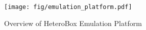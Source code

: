 \begin{figure}[t]
  \centering
  \texttt{[image: fig/emulation\_platform.pdf]}
  \caption{ Overview of HeteroBox Emulation Platform }
  \label{fig:emulation_platform_overview}
\end{figure}

